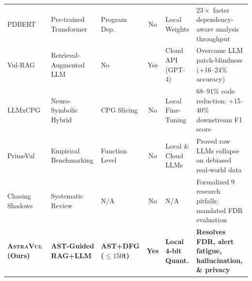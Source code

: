 \documentclass[10pt,twocolumn]{article}
\begin{document}
\begin{table}[!t]
\begin{tabular}{|p{2.5cm}|p{3.2cm}|p{2.0cm}|c|p{2.1cm}|p{5.6cm}|}
PDBERT~\cite{liu2024pdbert} & Pre-trained Transformer & Program Dep. & No & Local Weights & $23\times$ faster dependency-aware analysis throughput \\
Vul-RAG~\cite{du2024vulrag} & Retrieval-Augmented LLM & No & Yes & Cloud API (GPT-4) & Overcame LLM patch-blindness (+16--24\% accuracy) \\
LLMxCPG~\cite{lekssays2025llmxcpg} & Neuro-Symbolic Hybrid & CPG Slicing & No & Local Fine-Tuning & 68--91\% code reduction; +15--40\% downstream F1 score \\
PrimeVul~\cite{zhang2025howfar} & Empirical Benchmarking & Function Level & No & Local \& Cloud LLMs & Proved raw LLMs collapse on debiased real-world data \\
Chasing Shadows~\cite{arp2026chasingshadows} & Systematic Review & N/A & No & N/A & Formalized 9 research pitfalls; mandated FDR evaluation \\
\hline
\textbf{\textsc{AstraVul} (Ours)} & \textbf{AST-Guided RAG+LLM} & \textbf{AST+DFG ($\le 150$t)} & \textbf{Yes} & \textbf{Local 4-bit Quant.} & \textbf{Resolves FDR, alert fatigue, hallucination, \& privacy} \\
\hline
\end{tabular}
\end{table}

\begin{abstract}
\textbf{\textit{Abstract}}---Automated vulnerability detection is essential for securing modern software supply chains. However, software security engineering currently faces an operational trilemma: heuristic Static Application Security Testing (SAST) tools rely on rigid syntactic pattern matching that incurs debilitating False Discovery Rates ($\text{FDR} \ge 40\%$), deep learning models on code property graphs act as uninterpretable black boxes vulnerable to data distribution shifts, and naive querying of Large Language Models (LLMs) suffers from intellectual property leakage, attention dilution over large codebases, and hallucinated security diagnostics. In this paper, we propose \textbf{\textsc{AstraVul}}, an AST-Guided Retrieval-Augmented Generation (RAG) framework engineered for private, on-premise vulnerability detection and triage. \textsc{AstraVul} couples: (1)~deterministic Tree-sitter program slicing that isolates causal data-flow and control-flow paths into minimal token windows ($\le 150$ tokens), (2)~a persistent ChromaDB vector store grounded in 969 official MITRE/NIST Common Weakness Enumeration (CWE) specifications alongside contrastive patch diffs from DiverseVul and CVEfixes, and (3)~a local, 4-bit quantized LLM inference engine executing under strict Pydantic grammar constraints. In a controlled pilot micro-benchmark ($N=12$ paired test cases sampled from NIST Juliet v1.3 and DiverseVul), \textsc{AstraVul} successfully resolves all 4 false positives generated by Flawfinder while capturing subtle Use-After-Free (CWE-416) flaws missed by regex scanners, achieving a 36.0\%--70.0\% reduction in prompt token overhead with zero proprietary code exposure.
\end{abstract}
\end{document}
